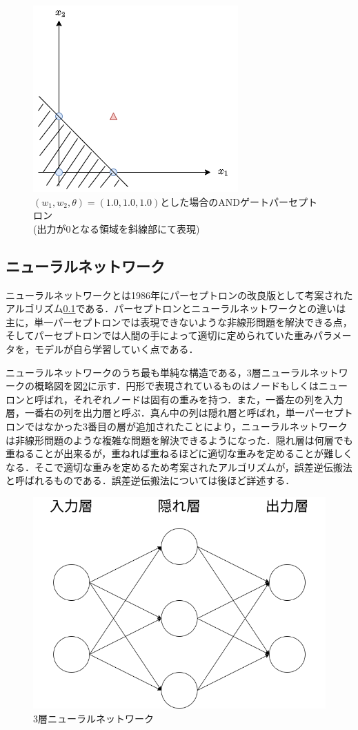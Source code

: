 \documentclass[a4j, 11pt]{jreport}
\begin{document}
\begin{figure}[H]
 \centering
 \includegraphics[width=0.5\hsize, keepaspectratio]{images/drawio/pa-seputoron_graph.png}
 \caption{$(w_1, w_2, \theta) = (1.0, 1.0, 1.0)$とした場合のANDゲートパーセプトロン\\(出力が0となる領域を斜線部にて表現)}
 \label{fig:pa-septoron_graph}
\end{figure}

\subsection{ニューラルネットワーク}
ニューラルネットワークとは1986年にパーセプトロンの改良版として考案されたアルゴリズム\ref{}である．パーセプトロンとニューラルネットワークとの違いは主に，単一パーセプトロンでは表現できないような非線形問題を解決できる点，そしてパーセプトロンでは人間の手によって適切に定められていた重みパラメータを，モデルが自ら学習していく点である．

ニューラルネットワークのうち最も単純な構造である，3層ニューラルネットワークの概略図を図\ref{fig:3nn}に示す．円形で表現されているものはノードもしくはニューロンと呼ばれ，それぞれノードは固有の重みを持つ．また，一番左の列を入力層，一番右の列を出力層と呼ぶ．真ん中の列は隠れ層と呼ばれ，単一パーセプトロンではなかった3番目の層が追加されたことにより，ニューラルネットワークは非線形問題のような複雑な問題を解決できるようになった．隠れ層は何層でも重ねることが出来るが，重ねれば重ねるほどに適切な重みを定めることが難しくなる．そこで適切な重みを定めるため考案されたアルゴリズムが，誤差逆伝搬法と呼ばれるものである．誤差逆伝搬法については後ほど詳述する．

\begin{figure}[H]
 \centering
 \includegraphics[width=0.7\hsize, keepaspectratio]{images/drawio/3nn.png}
 \caption{3層ニューラルネットワーク}
 \label{fig:3nn}
\end{figure}
\end{document}
